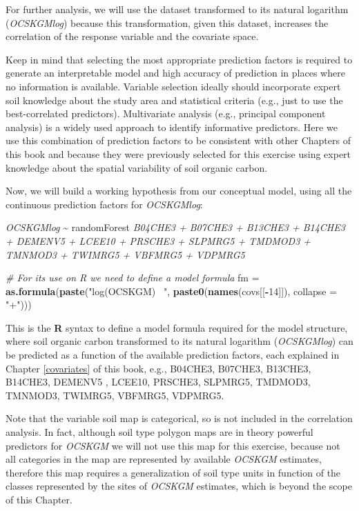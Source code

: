 \documentclass[10pt,b5paper,]{book}
\newenvironment{Shaded}{\begin{snugshade}}{\end{snugshade}}
\newcommand{\CommentTok}[1]{\textcolor[rgb]{0.56,0.35,0.01}{\textit{#1}}}
\newcommand{\DataTypeTok}[1]{\textcolor[rgb]{0.13,0.29,0.53}{#1}}
\newcommand{\DecValTok}[1]{\textcolor[rgb]{0.00,0.00,0.81}{#1}}
\newcommand{\KeywordTok}[1]{\textcolor[rgb]{0.13,0.29,0.53}{\textbf{#1}}}
\newcommand{\NormalTok}[1]{#1}
\newcommand{\OperatorTok}[1]{\textcolor[rgb]{0.81,0.36,0.00}{\textbf{#1}}}
\newcommand{\StringTok}[1]{\textcolor[rgb]{0.31,0.60,0.02}{#1}}
\theoremstyle{definition}
\theoremstyle{definition}
\theoremstyle{definition}
\theoremstyle{remark}
\begin{document}
For further analysis, we will use the dataset transformed to its natural
logarithm (\emph{OCSKGMlog}) because this transformation, given this
dataset, increases the correlation of the response variable and the
covariate space.

Keep in mind that selecting the most appropriate prediction factors is
required to generate an interpretable model and high accuracy of
prediction in places where no information is available. Variable
selection ideally should incorporate expert soil knowledge about the
study area and statistical criteria (e.g., just to use the
best-correlated predictors). Multivariate analysis (e.g., principal
component analysis) is a widely used approach to identify informative
predictors. Here we use this combination of prediction factors to be
consistent with other Chapters of this book and because they were
previously selected for this exercise using expert knowledge about the
spatial variability of soil organic carbon.

Now, we will build a working hypothesis from our conceptual model, using
all the continuous prediction factors for \emph{OCSKGMlog}:

\emph{OCSKGMlog} \textasciitilde{} randomForest \emph{B04CHE3 + B07CHE3
+ B13CHE3 + B14CHE3 + DEMENV5 + LCEE10 + PRSCHE3 + SLPMRG5 + TMDMOD3 +
TMNMOD3 + TWIMRG5 + VBFMRG5 + VDPMRG5}

\begin{Shaded}
\begin{Highlighting}[]
\CommentTok{# For its use on R we need to define a model formula}
\NormalTok{fm =}\StringTok{ }\KeywordTok{as.formula}\NormalTok{(}\KeywordTok{paste}\NormalTok{(}\StringTok{"log(OCSKGM) ~"}\NormalTok{, }\KeywordTok{paste0}\NormalTok{(}\KeywordTok{names}\NormalTok{(covs[[}\OperatorTok{-}\DecValTok{14}\NormalTok{]]),}
                                            \DataTypeTok{collapse =} \StringTok{"+"}\NormalTok{))) }
\end{Highlighting}
\end{Shaded}

This is the \textbf{R} syntax to define a model formula required for the
model structure, where soil organic carbon transformed to its natural
logarithm (\emph{OCSKGMlog}) can be predicted as a function of the
available prediction factors, each explained in Chapter \ref{covariates}
of this book, e.g., B04CHE3, B07CHE3, B13CHE3, B14CHE3, DEMENV5 ,
LCEE10, PRSCHE3, SLPMRG5, TMDMOD3, TMNMOD3, TWIMRG5, VBFMRG5, VDPMRG5.

Note that the variable soil map is categorical, so is not included in
the correlation analysis. In fact, although soil type polygon maps are
in theory powerful predictors for \emph{OCSKGM} we will not use this map
for this exercise, because not all categories in the map are represented
by available \emph{OCSKGM} estimates, therefore this map requires a
generalization of soil type units in function of the classes represented
by the sites of \emph{OCSKGM} estimates, which is beyond the scope of
this Chapter.
\end{document}
